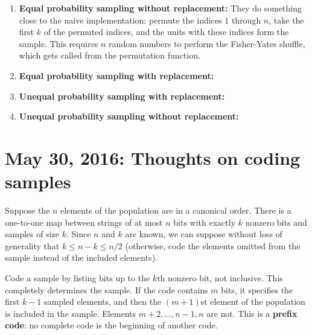 \documentclass[12pt]{article}
\begin{document}
\begin{itemize}
\begin{enumerate}
\begin{enumerate}
\item \textbf{Equal probability sampling without replacement:} 
They do something close to the naive implementation:
permute the indices $1$ through $n$,
take the first $k$ of the permuted indices,
and the units with these indices form the sample.
This requires $n$ random numbers to perform the Fisher-Yates shuffle, which gets called from the permutation function.
\item \textbf{Equal probability sampling with replacement:} 
\item \textbf{Unequal probability sampling with replacement:} 
\item \textbf{Unequal probability sampling without replacement:} 
\end{enumerate}
\end{enumerate}

\end{itemize}



\section{May 30, 2016: Thoughts on coding samples}

Suppose the $n$ elements of the population are in a canonical order.
There is a one-to-one map between strings of at most $n$ bits with exactly $k$ nonzero bits
and samples of size $k$. 
Since $n$ and $k$ are known, we can suppose without loss of generality that $k \le n-k \le n/2$
(otherwise, code the elements omitted from the sample instead of the included elements).

Code a sample by listing bits up to the $k$th nonzero bit, not inclusive.
This completely determines the sample.
If the code contains $m$ bits, it specifies the first $k-1$ sampled elements, and then the $(m+1)$st element of the population is included in the sample.
Elements $m+2, \dots, n-1, n$ are not.
This is a \textbf{prefix code}: no complete code is the beginning of another code.
\end{document}
